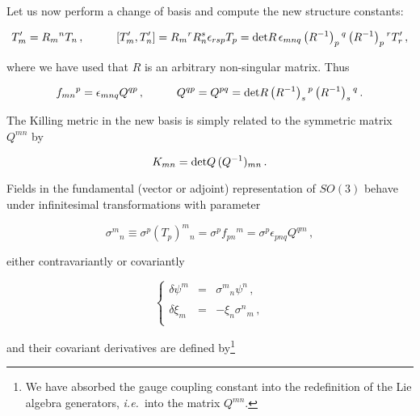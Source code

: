 \documentclass[12pt,a4paper]{article}
\begin{document}
Let us now perform a change of basis and compute the new structure constants:

\begin{equation}
T^{\prime}_{m}=R_{m}{}^{n}T_{n}\, ,
\hspace{1cm}
[T^{\prime}_{m},T^{\prime}_{n}] =R_{m}{}^{r}R_{n}^{s}\epsilon_{rsp}T_{p}=
{\rm det}R\, \epsilon_{mnq}\left(R^{-1}\right)_{p}{}^{q}
\left(R^{-1}\right)_{p}{}^{r} T^{\prime}_{r}\, ,
\end{equation}

\noindent where we have used that $R$ is an arbitrary non-singular matrix. 
Thus

\begin{equation}
f_{mn}{}^{p}=\epsilon_{mnq} Q^{qp}\, ,
\hspace{1cm}
Q^{qp}= Q^{pq}  = {\rm det}R \left(R^{-1}\right)_{s}{}^{p}
\left(R^{-1}\right)_{s}{}^{q}\, .
\end{equation}

The Killing metric in the new basis is simply related to the symmetric
matrix $Q^{mn}$ by

\begin{equation}
K_{mn} = {\rm det}Q\, (Q^{-1})_{mn}\, .
\end{equation}

Fields in the fundamental (vector or adjoint) representation of
$SO(3)$ behave under infinitesimal transformations with parameter

\begin{equation}
\sigma^{m}{}_{n}\equiv\sigma^{p}\left(T_{p}\right)^{m}{}_{n}=
\sigma^{p}f_{pn}{}^{m}=\sigma^{p}\epsilon_{pnq}Q^{qm}\, ,  
\end{equation}

\noindent either contravariantly or covariantly

\begin{equation}
\left\{
\begin{array}{rcl}
\delta \psi^{m} & = & \sigma^{m}{}_{n}\psi^{n}\, ,\\
& & \\
\delta \xi_{m} & = & -\xi_{n}\sigma^{n}{}_{m}\, ,\\
\end{array}
\right.
\end{equation}

\noindent and their covariant derivatives are defined by\footnote{We 
  have absorbed the gauge coupling constant into the redefinition of
  the Lie algebra generators, {\em i.e.}~into the matrix $Q^{mn}$.}
\end{document}
